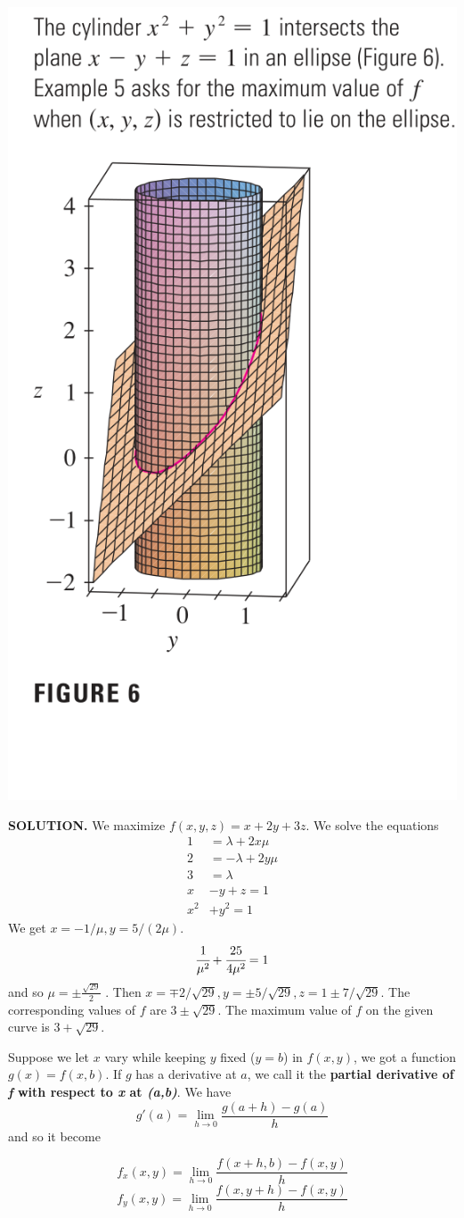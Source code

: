\documentclass{article}
\begin{document}
\begin{minipage}[]{0.3\linewidth}
  \includegraphics[width = 4.3 cm]{./images/2constraints.png}
  
\end{minipage}
\begin{minipage}[]{0.67\linewidth}
{\selectfont \textbf{\textcolor{blue5}{SOLUTION.}}} 
We maximize $f(x,y,z) = x + 2y + 3z $. We solve the equations 
\begin{equation*}
  \begin{split}
    1 & = \lambda + 2x \mu \\
    2 & = - \lambda + 2y \mu \\ 
    3 &  = \lambda \\
    x & - y + z = 1 \\
    x^2 &  + y^2 = 1 
  \end{split}
\end{equation*}
We get $x = -1/\mu , y = 5 / (2 \mu  )$. 
\[\cfrac{1 }{\mu ^2 } + \cfrac{25 }{4 \mu ^2 } = 1 \]
and so $\mu = \pm \frac{\sqrt{29} }{2 }$  . Then $x = \mp 2/ \sqrt{29 }, y = \pm 5 / \sqrt{29 }, z = 1 \pm 7/ \sqrt{29 }  $. The corresponding values of $f $ are $3 \pm \sqrt{29 }$. The maximum value of $f$ on the given curve is $3 + \sqrt{29 }$.
  
\end{minipage}

Suppose we let $x$ vary while keeping $y$ fixed ($y = b$) in $f(x,y)$, we got a function $g(x) = f(x,b)$. If $g$ has a derivative at $a$, we call it the \textbf{partial derivative of \textit{f} with respect to \textit{x} at \textit{(a,b)}}. We have 
\[g'(a) = \lim_{h \to  0 }\frac{g(a + h) - g(a)}{h }\]
and so it become $\quad$
\begin{minipage}[]{0.6\linewidth}
\begin{mdframed}
\[f_x (x,y) = \lim_{h \to 0} \frac{f(x + h, b) - f(x,y)}{h }\]
\[f_y (x,y) = \lim_{h \to 0} \frac{f(x , y + h) - f(x,y)}{h }\]
  \end{mdframed}
\end{minipage}
\end{document}
